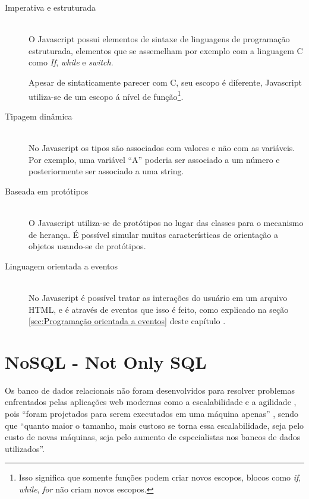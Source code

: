 \begin{description}
\item[Imperativa e estruturada] \hfill \\ 
O Javascript possui elementos de sintaxe de linguagens de programação estruturada, elementos que se assemelham por exemplo com a linguagem C como \textit{If}, \textit{while} e \textit{switch}.

Apesar de sintaticamente parecer com C, seu escopo é diferente, Javascript utiliza-se de um escopo á nível de função\footnote{Isso significa que somente funções podem criar novos escopos, blocos como \textit{if}, \textit{while}, \textit{for} não criam novos escopos.}.

\item[Tipagem dinâmica] \hfill \\
No Javascript os tipos são associados com valores e não com as variáveis. Por exemplo, uma variável ``A'' poderia ser associado a um número e posteriormente ser associado a uma string. 


\item[Baseada em protótipos] \hfill \\
 O Javascript utiliza-se de protótipos no lugar das classes para o mecanismo de herança. É possível simular muitas características de orientação a objetos usando-se de protótipos.

\item[Linguagem orientada a eventos] \hfill \\
 No Javascript é possível tratar as interações do usuário em um arquivo HTML, e é através de eventos que isso é feito, como explicado na seção \ref{sec:Programação orientada a eventos} deste capítulo .

\end{description}

\section{NoSQL - Not Only SQL}
\label{sec: NoSQL - Not Only SQL}
Os banco de dados relacionais não foram desenvolvidos para resolver problemas enfrentados pelas aplicações web modernas como a escalabilidade e a agilidade \cite{mongoNosql}, pois ``foram projetados para serem executados em uma máquina apenas'' \cite{compBds}, sendo que ``quanto maior o tamanho, mais custoso se torna essa escalabilidade, seja pelo custo de novas máquinas, seja pelo aumento de especialistas nos bancos de dados utilizados''.\cite{IntNosql}

